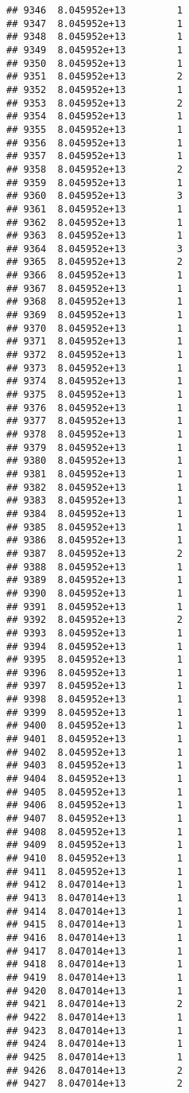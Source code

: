 \documentclass[
]{article}
\begin{document}
\begin{verbatim}
## 9346  8.045952e+13         1
## 9347  8.045952e+13         1
## 9348  8.045952e+13         1
## 9349  8.045952e+13         1
## 9350  8.045952e+13         1
## 9351  8.045952e+13         2
## 9352  8.045952e+13         1
## 9353  8.045952e+13         2
## 9354  8.045952e+13         1
## 9355  8.045952e+13         1
## 9356  8.045952e+13         1
## 9357  8.045952e+13         1
## 9358  8.045952e+13         2
## 9359  8.045952e+13         1
## 9360  8.045952e+13         3
## 9361  8.045952e+13         1
## 9362  8.045952e+13         1
## 9363  8.045952e+13         1
## 9364  8.045952e+13         3
## 9365  8.045952e+13         2
## 9366  8.045952e+13         1
## 9367  8.045952e+13         1
## 9368  8.045952e+13         1
## 9369  8.045952e+13         1
## 9370  8.045952e+13         1
## 9371  8.045952e+13         1
## 9372  8.045952e+13         1
## 9373  8.045952e+13         1
## 9374  8.045952e+13         1
## 9375  8.045952e+13         1
## 9376  8.045952e+13         1
## 9377  8.045952e+13         1
## 9378  8.045952e+13         1
## 9379  8.045952e+13         1
## 9380  8.045952e+13         1
## 9381  8.045952e+13         1
## 9382  8.045952e+13         1
## 9383  8.045952e+13         1
## 9384  8.045952e+13         1
## 9385  8.045952e+13         1
## 9386  8.045952e+13         1
## 9387  8.045952e+13         2
## 9388  8.045952e+13         1
## 9389  8.045952e+13         1
## 9390  8.045952e+13         1
## 9391  8.045952e+13         1
## 9392  8.045952e+13         2
## 9393  8.045952e+13         1
## 9394  8.045952e+13         1
## 9395  8.045952e+13         1
## 9396  8.045952e+13         1
## 9397  8.045952e+13         1
## 9398  8.045952e+13         1
## 9399  8.045952e+13         1
## 9400  8.045952e+13         1
## 9401  8.045952e+13         1
## 9402  8.045952e+13         1
## 9403  8.045952e+13         1
## 9404  8.045952e+13         1
## 9405  8.045952e+13         1
## 9406  8.045952e+13         1
## 9407  8.045952e+13         1
## 9408  8.045952e+13         1
## 9409  8.045952e+13         1
## 9410  8.045952e+13         1
## 9411  8.045952e+13         1
## 9412  8.047014e+13         1
## 9413  8.047014e+13         1
## 9414  8.047014e+13         1
## 9415  8.047014e+13         1
## 9416  8.047014e+13         1
## 9417  8.047014e+13         1
## 9418  8.047014e+13         1
## 9419  8.047014e+13         1
## 9420  8.047014e+13         1
## 9421  8.047014e+13         2
## 9422  8.047014e+13         1
## 9423  8.047014e+13         1
## 9424  8.047014e+13         1
## 9425  8.047014e+13         1
## 9426  8.047014e+13         2
## 9427  8.047014e+13         2

\end{verbatim}
\end{document}

